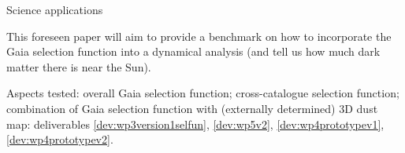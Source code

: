 \begin{workpackage}{Science applications}
\begin{wpobjectives}
\begin{description}
{        This foreseen paper will aim  to provide a benchmark on how to incorporate the Gaia selection function into a dynamical analysis (and tell us how much dark matter there is near the Sun).
        
        \textsf{Aspects tested: overall Gaia selection function; cross-catalogue selection function; combination of Gaia selection function with (externally determined) 3D dust map: deliverables \ref{dev:wp3version1selfun}, \ref{dev:wp5v2}, \ref{dev:wp4prototypev1}, \ref{dev:wp4prototypev2}.}    
    }
      
      
        
      

\end{description}
\end{wpobjectives}
\end{workpackage}

